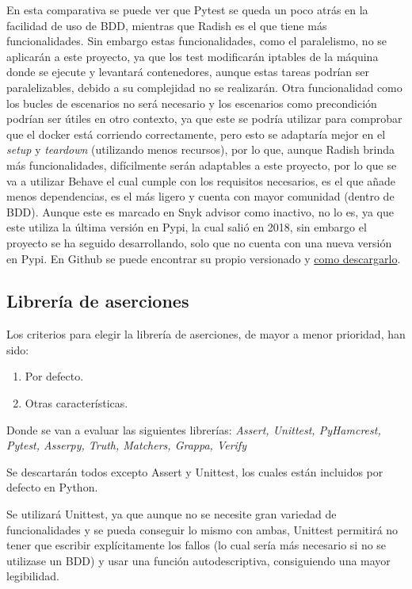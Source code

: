 En esta comparativa se puede ver que Pytest se queda un poco atrás en la facilidad de uso de BDD, mientras que Radish es el que tiene más funcionalidades. Sin embargo estas funcionalidades, como el paralelismo, no se aplicarán a este proyecto, ya que los test modificarán iptables de la máquina donde se ejecute y levantará contenedores, aunque estas tareas podrían ser paralelizables, debido a su complejidad no se realizarán. Otra funcionalidad como los bucles de escenarios no será necesario y los escenarios como precondición podrían ser útiles en otro contexto, ya que este se podría utilizar para comprobar que el docker está corriendo correctamente, pero esto se adaptaría mejor en el \textit{setup} y \textit{teardown} (utilizando menos recursos), por lo que, aunque Radish brinda más funcionalidades, difícilmente serán adaptables a este proyecto, por lo que se va a utilizar Behave el cual cumple con los requisitos necesarios, es el que añade menos dependencias, es el más ligero y cuenta con mayor comunidad (dentro de BDD). Aunque este es marcado en Snyk advisor\cite{snyk} como inactivo, no lo es, ya que este utiliza la última versión en Pypi, la cual salió en 2018, sin embargo el proyecto se ha seguido desarrollando, solo que no cuenta con una nueva versión en Pypi. En Github se puede encontrar su propio versionado y \href{https://behave.readthedocs.io/en/latest/install/#using-the-github-repository}{como descargarlo}.


\subsection{Librería de aserciones}
Los criterios para elegir la librería de aserciones, de mayor a menor prioridad, han sido:

\begin{enumerate}
    \item Por defecto.
    \item Otras características.
\end{enumerate}

Donde se van a evaluar las siguientes librerías: \textit{Assert, Unittest, PyHamcrest, Pytest, Asserpy, Truth, Matchers, Grappa, Verify}

Se descartarán todos excepto Assert y Unittest, los cuales están incluidos por defecto en Python.

Se utilizará Unittest, ya que aunque no se necesite gran variedad de funcionalidades y se pueda conseguir lo mismo con ambas, Unittest permitirá no tener que escribir explícitamente los fallos (lo cual sería más necesario si no se utilizase un BDD) y usar una función autodescriptiva, consiguiendo una mayor legibilidad.

